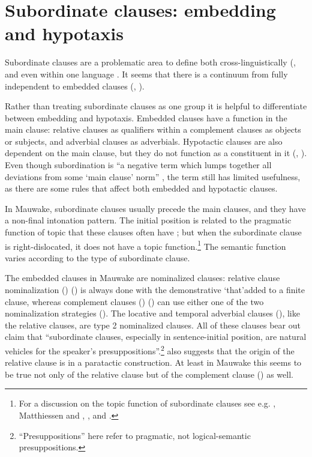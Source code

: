 \section{Subordinate clauses: embedding and hypotaxis} \label{sec:8.3}

Subordinate clauses are a problematic area to define both cross-linguistically (\citealt{HaimanEtAl1984}, \citealt[317]{MatthiessenEtAl1988} and even within one language \citep[848]{Givon1990}. It seems that there is a continuum from fully independent to embedded clauses (\citealt[207]{Reesink1987}, \citealt[189]{Lehmann1988}). 

Rather than treating subordinate clauses as one group it is helpful to differentiate between embedding and hypotaxis. Embedded clauses have a function in the main clause: relative clauses as qualifiers within a  complement clauses as objects or subjects, and adverbial clauses as adverbials. Hypotactic clauses are also dependent on the main clause, but they do not function as a constituent in it (\citealt[219]{Halliday1985}, \citealt{Lehmann1988}). Even though subordination is ``a negative term which lumps together all deviations from some `main clause' norm'' \citep[510]{HaimanEtAl1984}%
, the term still has limited usefulness, as there are some rules that affect both embedded and hypotactic clauses.  

In Mauwake, subordinate clauses usually precede the main clauses, and they have a non-final intonation pattern. The initial position is related to the pragmatic function of topic that these clauses often have \citep[187]{Lehmann1988}; but when the subordinate clause is right-dislocated, it does not have a topic function.\footnote{For a discussion on the topic function of subordinate clauses see e.g. \citet{Reesink1983b, Reesink1987}, Matthiessen and \citet{Thompson1988}, \citet{LehmannEtAl1988}, and \citet{LongacreEtAl2007}.}  The semantic function varies according to the type of subordinate clause. 

The embedded clauses in Mauwake are nominalized clauses: relative clause nominalization () () is always done with the demonstrative \textstyleStyleVernacularWordsItalic `that'added to a finite clause, whereas complement clauses () () can use either one of the two nominalization strategies (). The locative and temporal adverbial clauses (), like the relative clauses, are type 2 nominalized clauses. All of these clauses bear out  claim that ``subordinate clauses, especially in sentence-initial position, are natural vehicles for the speaker's presuppositions''.\footnote{``Presuppositions'' here refer to pragmatic, not logical-semantic presuppositions.}  \citet[230]{Reesink1983b} also suggests that the origin of the relative clause is in a paratactic construction. At least in Mauwake this seems to be true not only of the relative clause but of the complement clause () as well. 

